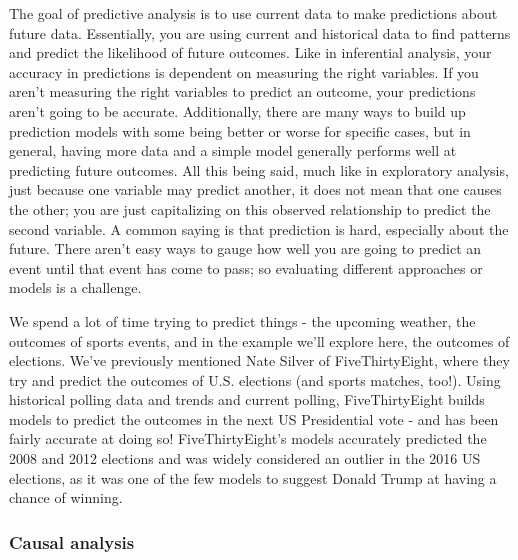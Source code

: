 \documentclass[
]{book}
\begin{document}
The goal of predictive analysis is to use current data to make predictions about future data. Essentially, you are using current and historical data to find patterns and predict the likelihood of future outcomes.
Like in inferential analysis, your accuracy in predictions is dependent on measuring the right variables. If you aren't measuring the right variables to predict an outcome, your predictions aren't going to be accurate. Additionally, there are many ways to build up prediction models with some being better or worse for specific cases, but in general, having more data and a simple model generally performs well at predicting future outcomes.
All this being said, much like in exploratory analysis, just because one variable may predict another, it does not mean that one causes the other; you are just capitalizing on this observed relationship to predict the second variable.
A common saying is that prediction is hard, especially about the future. There aren't easy ways to gauge how well you are going to predict an event until that event has come to pass; so evaluating different approaches or models is a challenge.

We spend a lot of time trying to predict things - the upcoming weather, the outcomes of sports events, and in the example we'll explore here, the outcomes of elections. We've previously mentioned Nate Silver of FiveThirtyEight, where they try and predict the outcomes of U.S. elections (and sports matches, too!). Using historical polling data and trends and current polling, FiveThirtyEight builds models to predict the outcomes in the next US Presidential vote - and has been fairly accurate at doing so! FiveThirtyEight's models accurately predicted the 2008 and 2012 elections and was widely considered an outlier in the 2016 US elections, as it was one of the few models to suggest Donald Trump at having a chance of winning.

\hypertarget{causal-analysis}{%
\subsubsection{Causal analysis}\label{causal-analysis}}
\end{document}
